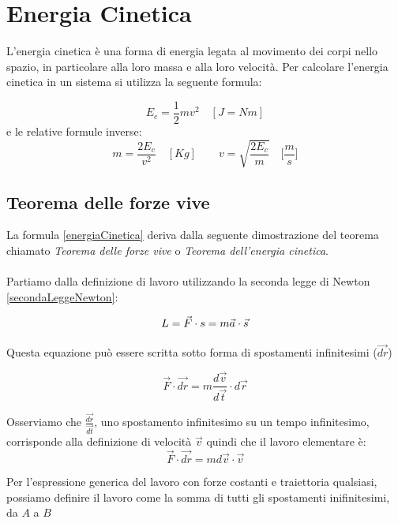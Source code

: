 \section{Energia Cinetica}
L'energia cinetica è una forma di energia legata al movimento dei corpi nello spazio, in particolare alla loro massa e alla loro velocità.
Per calcolare l'energia cinetica in un sistema si utilizza la seguente formula:

\begin{equation}
    E_c = \frac{1}{2}mv^2\quad  [J = Nm]
    \label{energiaCinetica}
\end{equation}
e le relative formule inverse: 
\begin{equation}
    m = \frac{2E_c}{v^2} \quad  [Kg]\qquad v = \sqrt{\frac{2E_c}{m}} \quad  \biggl[\frac{m}{s}\biggl]
\end{equation}

\subsection{Teorema delle forze vive}

La formula \ref{energiaCinetica} deriva dalla seguente dimostrazione del teorema chiamato \textit{Teorema delle forze vive} o \textit{Teorema dell'energia cinetica}.
\paragraph{}
Partiamo dalla definizione di lavoro utilizzando la seconda legge di Newton \ref{secondaLeggeNewton}: 

\begin{equation*}
    L = \vec{F}\cdot s = m\vec{a} \cdot \vec{s}
\end{equation*}

Questa equazione può essere scritta sotto forma di spostamenti infinitesimi ($\vec{dr}$)

\begin{equation*}
   \vec{F}\cdot\vec{dr} = m\frac{d\vec{v}}{d\vec{t}}\cdot d\vec{r}
\end{equation*}

Osserviamo che $\frac{\vec{dr}}{\vec{dt}}$, uno spostamento infinitesimo su un tempo infinitesimo, corrisponde alla definizione di velocità $\vec{v}$ quindi  che il lavoro elementare è:
\begin{equation*}
    \vec{F}\cdot\vec{dr} = md\vec{v}\cdot \vec{v}
\end{equation*}

Per l'espressione generica del lavoro con forze costanti e traiettoria qualsiasi, possiamo definire il lavoro come la somma di tutti gli spostamenti inifinitesimi, da $A$ a $B$ 

